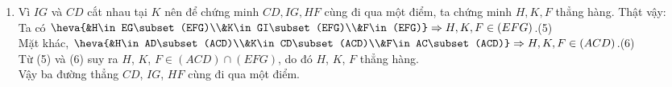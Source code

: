 \begin{bt}
\begin{bt}
{\begin{enumerate}
			Từ (3) và (4) suy ra $FK=(EFG)\cap (ACD)$.
			\item Vì $IG$ và $CD$ cắt nhau tại $K$ nên để chứng minh $CD, IG, HF$ cùng đi qua một điểm, ta chứng minh $H, K, F$ thẳng hàng. Thật vậy:\\
			Ta có $\heva{&H\in EG\subset (EFG)\\&K\in GI\subset (EFG)\\&F\in (EFG)}\Rightarrow H, K, F\in (EFG)$.\hfill (5) \\
			Mặt khác, $\heva{&H\in AD\subset (ACD)\\&K\in CD\subset (ACD)\\&F\in AC\subset (ACD)}\Rightarrow H, K, F\in (ACD)$.\hfill (6) \\
			Từ (5) và (6) suy ra $H$, $K$, $F\in (ACD)\cap (EFG)$, do đó $H$, $K$, $F$ thẳng hàng.\\
			Vậy ba đường thẳng $CD$, $IG$, $HF$ cùng đi qua một điểm. 
		\end{enumerate}	
	}
\end{bt}


\end{bt}
